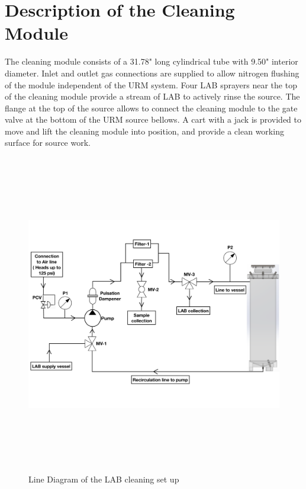 \section{Description of the Cleaning Module}
The cleaning module consists of a  31.78" long cylindrical tube with 9.50" interior diameter. Inlet and outlet gas connections are supplied to allow nitrogen flushing of the module independent of the URM system. Four LAB sprayers near the top of the cleaning module provide a stream of LAB to actively rinse the source. The flange at the top of the source allows  to connect the cleaning module to the gate valve at the bottom of the URM source bellows. A cart with a jack is provided to move and lift the cleaning module into position, and provide a clean working surface for source work.
\begin{figure}[!htpb]
  \centering
  \includegraphics[width = 14cm, height=14cm ]{figures/LAB_2}
  \caption{Line Diagram of the LAB cleaning set up}
  \label{fig:SCV}
\end{figure}
\\

